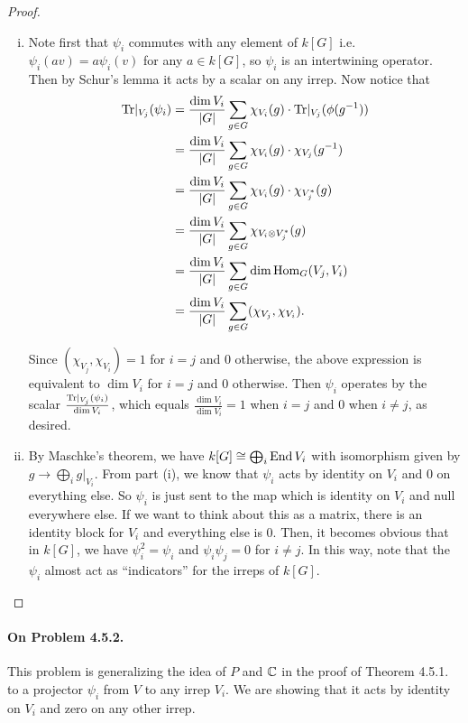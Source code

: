 \documentclass[oneside]{scrbook}
\begin{document}
\begin{proof}
\begin{enumerate}[(i)]
    \item Note first that $\psi_i$ commutes with any element of $k[G]$ i.e. $\psi_i(av) = a\psi_i(v)$ for any $a \in k[G]$, so $\psi_i$ is an intertwining operator. Then by Schur's lemma it acts by a scalar on any irrep. Now notice that 
    \begin{align*}
        \operatorname{Tr}\rvert_{V_j}(\psi_i) &= \frac{\dim{V_i}}{|G|} \sum_{g \in G} \chi_{V_i} (g) \cdot \operatorname{Tr}\rvert_{V_j}(\phi(g^{-1})) \\
        &= \frac{\dim{V_i}}{|G|} \sum_{g \in G} \chi_{V_i} (g) \cdot \chi_{V_j}(g^{-1}) \\
        &= \frac{\dim{V_i}}{|G|} \sum_{g \in G} \chi_{V_i} (g) \cdot \chi_{V_j^{*}}(g) \\
        &= \frac{\dim{V_i}}{|G|} \sum_{g \in G} \chi_{V_i \otimes V_j^{*}} (g) \\
        &= \frac{\dim{V_i}}{|G|} \sum_{g \in G} \dim\operatorname{Hom}_G(V_j, V_i) \\
        &= \frac{\dim{V_i}}{|G|} \sum_{g \in G} (\chi_{V_j}, \chi_{V_i}).
    \end{align*}

Since $(\chi_{V_j}, \chi_{V_i}) = 1$ for $i=j$ and $0$ otherwise, the above expression is equivalent to $\dim V_i$ for $i=j$ and $0$ otherwise. Then $\psi_i$ operates by the scalar $\frac{\operatorname{Tr}\rvert_{V_j}(\psi_i)}{\dim V_i}$, which equals $\frac{\dim V_i}{\dim V_i} = 1$ when $i=j$ and $0$ when $i \neq j$, as desired.
    \item By Maschke's theorem, we have $k[G]\cong\bigoplus_{i}\operatorname{End} V_i$ with isomorphism given by $g\to \bigoplus_i g\vert_{V_i}$. From part (i), we know that $\psi_i$ acts by identity on $V_i$ and $0$ on everything else. So $\psi_i$ is just sent to the map which is identity on $V_i$ and null everywhere else. If we want to think about this as a matrix, there is an identity block for $V_i$ and everything else is $0$. Then, it becomes obvious that in $k[G]$, we have $\psi_i^2=\psi_i$ and $\psi_i\psi_j=0$ for $i\neq j$. In this way, note that the $\psi_i$ almost act as ``indicators'' for the irreps of $k[G]$. 
\end{enumerate}
\end{proof}

\paragraph{On Problem 4.5.2.} This problem is generalizing the idea of $P$ and $\mathbb C$ in the proof of Theorem 4.5.1. to a projector $\psi_i$ from $V$ to any irrep $V_i$. We are showing that it acts by identity on $V_i$ and zero on any other irrep.
\end{document}
